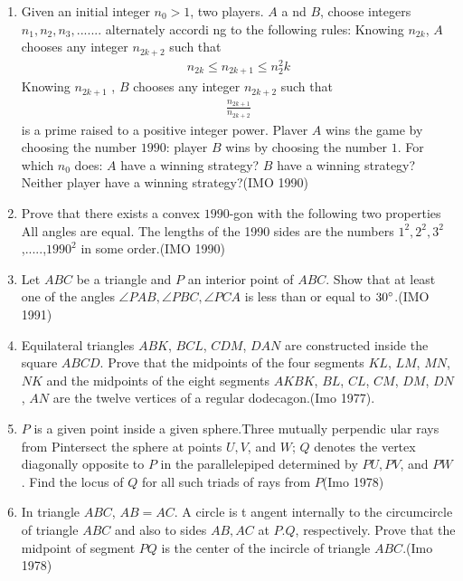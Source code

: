 \begin{enumerate}
     \item Given an initial integer $n_0 > 1$, two players. $A$ a    nd $B$, choose integers $n_1, n_2 , n_3,.......$ alternately accordi    ng to the following rules:
           Knowing $n_{2k}$, $A$ chooses any integer $n_{2k+2}$ such that \begin{align*} n_{2k}\leq n_{2k+1} \leq n^{2}_2{k} \end{align*}
   Knowing $n_{2k+1}$ , $B$ chooses any integer $n_{2k+2}$ such that \begin{align*}
              \frac{n_{2k+1}}{n_{2k+2}}\end{align*}
  is a prime raised to a positive integer power.
	Plaver $A$ wins the game by choosing the number $1990$: player $B$ wins by choosing the number $1$. For which $n_0$ does:
$A$ have a winning strategy?
 $B$ have a winning strategy?
 Neither player have a winning strategy?\hfill(IMO 1990)

\item Prove that there exists a convex $1990$-gon with the following     two properties
 All angles are equal.
 The lengths of the 1990 sides are the numbers $1^2, 2^2, 3^    2$,.....,$1990^2$ in some order.\hfill(IMO 1990)

\item Let $ABC$ be a triangle and $P$ an interior point of $ABC$.     Show that at least one of the angles $\angle{PAB}, \angle{PBC}, \angle{PCA}$ is less than or equal to $30\degree$.\hfill(IMO 1991)

\item Equilateral triangles $ABK$, $BCL$, $CDM$, $DAN$ are constructed inside the square $ABCD$. Prove that the midpoints of the four segments $KL$, $LM$, $MN$, $NK$ and the midpoints of the eight segments $AKBK$, $BL$, $CL$, $CM$, $DM$, $DN$, $AN$ are the twelve vertices of a regular dodecagon.\hfill(Imo 1977).
\item $P$ is a given point inside a given sphere.Three mutually perpendic ular rays from Pintersect the sphere at points $U, V$, and $W$; $Q$ denotes the vertex diagonally opposite to $P$ in the parallelepiped determined by $PU, PV$, and $PW$.     Find the locus of $Q$ for all such triads of rays from $P$\hfill(Imo 1978)
\item In triangle $ABC$, $AB = AC$. A circle is t    angent internally to the circumcircle of triangle $ABC$ and also to sides $AB, AC$ at $P. Q$, respectively. Prove that the midpoint of segment $PQ$ is the center of the incircle of triangle $ABC.$\hfill(Imo 1978)


\end{enumerate}
